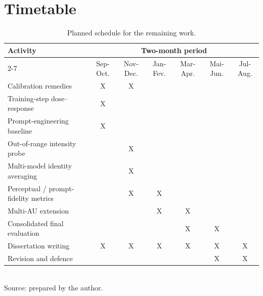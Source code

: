 \section{Timetable}\label{sec:sched-timetable}

%

\begin{table}[H]
    \centering
    \caption{Planned schedule for the remaining work.}
    \label{tab:timetable}
    \footnotesize
    \begin{tabular}{@{}lcccccc@{}}
        \toprule
        Activity & \multicolumn{6}{c}{Two-month period} \\
        \cmidrule(l){2-7}
                 & Sep-Oct. & Nov-Dec. & Jan-Fev. & Mar-Apr. & Mai-Jun. & Jul-Aug. \\
        \midrule
        Calibration remedies                 & X & X &   &   &   &   \\
        Training-step dose--response         & X &   &   &   &   &   \\
        Prompt-engineering baseline          & X &   &   &   &   &   \\
        Out-of-range intensity probe         &   & X &   &   &   &   \\
        Multi-model identity averaging       &   & X &   &   &   &   \\
        Perceptual / prompt-fidelity metrics &   & X & X &   &   &   \\
        Multi-AU extension                   &   &   & X & X &   &   \\
        Consolidated final evaluation        &   &   &   & X & X &   \\
        Dissertation writing                 & X & X & X & X & X & X \\
        Revision and defence                 &   &   &   &   & X & X \\
        \bottomrule
    \end{tabular}\\[4pt]
    {\footnotesize Source: prepared by the author.}
\end{table}


